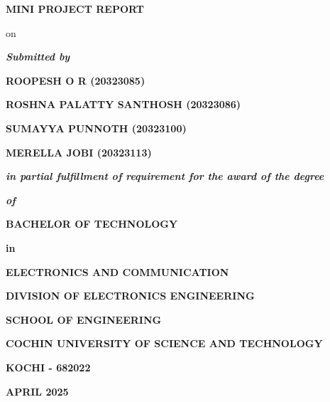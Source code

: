 \begin{titlepage}
	\titlepagefont
	\centering
	
	\vspace*{1cm}
	{\sectionFont \textbf{MINI PROJECT REPORT} \par}
	\vspace{.2cm}
	{\sectionFont on \par}
	\vspace{.5cm}

	{ \par}

	\vspace{.7cm}

	{\textit{\textbf{Submitted by}} \par}
	\vspace{.5cm}

	\textbf {ROOPESH O R (20323085)} \par
	\textbf {ROSHNA PALATTY SANTHOSH (20323086)} \par
	\textbf {SUMAYYA PUNNOTH (20323100)} \par
	\textbf {MERELLA JOBI (20323113)} \par

	\vspace{.8cm}
	{\textit{\textbf{in partial fulfillment of requirement for the award of the degree} }\par}
	{\textit{\textbf{of}}} \par
	\vspace{.6cm}
	{\textbf{BACHELOR OF TECHNOLOGY} \par}
	{\textbf{in}} \par
	{\textbf{ELECTRONICS AND COMMUNICATION} \par}
	\vspace{1cm}

	\par

	\vspace{1cm}

	{\textbf{DIVISION OF ELECTRONICS ENGINEERING} \par}
	{\textbf{SCHOOL OF ENGINEERING} \par}
	{\textbf{COCHIN UNIVERSITY OF SCIENCE AND TECHNOLOGY} \par}
	{\textbf{KOCHI - 682022} \par}

	\vspace{.5cm}

	{\textbf{APRIL 2025} \par}

	\vspace*{\fill}

\end{titlepage}